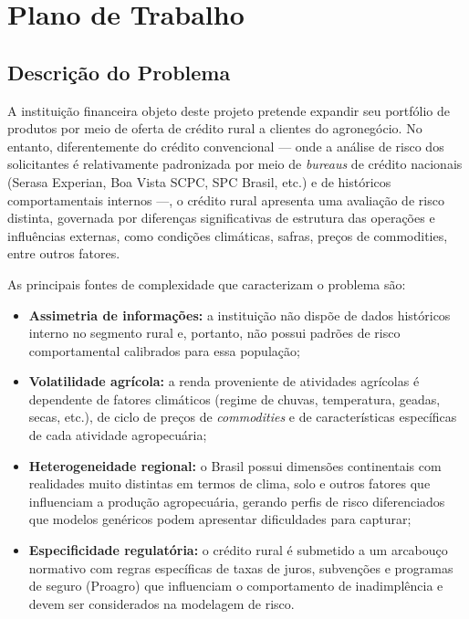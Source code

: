 \chapter{Plano de Trabalho} \label{cha:plano}


\section{Descrição do Problema}

A instituição financeira objeto deste projeto pretende expandir seu portfólio de produtos por meio de oferta de crédito rural a clientes do agronegócio. No entanto, diferentemente do crédito convencional — onde a análise de risco dos solicitantes é relativamente padronizada por meio de \textit{bureaus} de crédito nacionais (Serasa Experian, Boa Vista SCPC, SPC Brasil, etc.) e de históricos comportamentais internos —, o crédito rural apresenta uma avaliação de risco distinta, governada por diferenças significativas de estrutura das operações e influências externas, como condições climáticas, safras, preços de commodities, entre outros fatores.

As principais fontes de complexidade que caracterizam o problema são:
\begin{itemize}
    \item[(i)] \textbf{Assimetria de informações:} a instituição não dispõe de dados históricos interno no segmento rural e, portanto, não possui padrões de risco comportamental calibrados para essa população;
    \item[(ii)] \textbf{Volatilidade agrícola:} a renda proveniente de atividades agrícolas é dependente de fatores climáticos (regime de chuvas, temperatura, geadas, secas, etc.), de ciclo de preços de \textit{commodities} e de características específicas de cada atividade agropecuária;
    \item[(iii)] \textbf{Heterogeneidade regional:} o Brasil possui dimensões continentais com realidades muito distintas em termos de clima, solo e outros fatores que influenciam a produção agropecuária, gerando perfis de risco diferenciados que modelos genéricos podem apresentar dificuldades para capturar;
    \item[(iv)] \textbf{Especificidade regulatória:} o crédito rural é submetido a um arcabouço normativo com regras específicas de taxas de juros, subvenções e programas de seguro (Proagro) que influenciam o comportamento de inadimplência e devem ser considerados na modelagem de risco.
\end{itemize}

